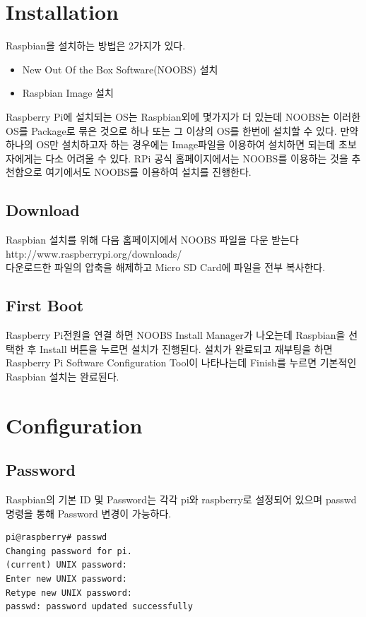 \documentclass[11pt
  , a4paper
  , article
  , oneside
]{memoir}
\begin{document}
\section{Installation}
Raspbian을 설치하는 방법은 2가지가 있다.
\begin{itemize}
\item New Out Of the Box Software(NOOBS) 설치
\item Raspbian Image 설치
\end{itemize}
Raspberry Pi에 설치되는 OS는 Raspbian외에 몇가지가 더 있는데 NOOBS는 이러한 OS를 Package로 묶은 것으로 
하나 또는 그 이상의 OS를 한번에 설치할 수 있다. 만약 하나의 OS만 설치하고자 하는 경우에는 Image파일을 
이용하여 설치하면 되는데 초보자에게는 다소 어려울 수 있다. RPi 공식 홈페이지에서는 NOOBS를 이용하는 것을 추천함으로 여기에서도 NOOBS를 이용하여 설치를 진행한다.
\subsection{Download}
Raspbian 설치를 위해 다음 홈페이지에서 NOOBS 파일을 다운 받는다\\
http://www.raspberrypi.org/downloads/\\
다운로드한 파일의 압축을 해제하고 Micro SD Card에 파일을 전부 복사한다.\\
\subsection{First Boot}
Raspberry Pi전원을 연결 하면 NOOBS Install Manager가 나오는데 Raspbian을 선택한 후 Install 버튼을 
누르면 설치가 진행된다. 설치가 완료되고 재부팅을 하면 Raspberry Pi Software Configuration Tool이 
나타나는데 Finish를 누르면 기본적인 Raspbian 설치는 완료된다.
\section{Configuration}
\subsection{Password}
Raspbian의 기본 ID 및 Password는 각각 pi와 raspberry로 설정되어 있으며 passwd 명령을 통해 Password
변경이 가능하다.
\begin{lstlisting}[style=termstyle]
pi@raspberry# passwd
Changing password for pi.
(current) UNIX password:
Enter new UNIX password:
Retype new UNIX password:
passwd: password updated successfully
\end{lstlisting}
\end{document}
